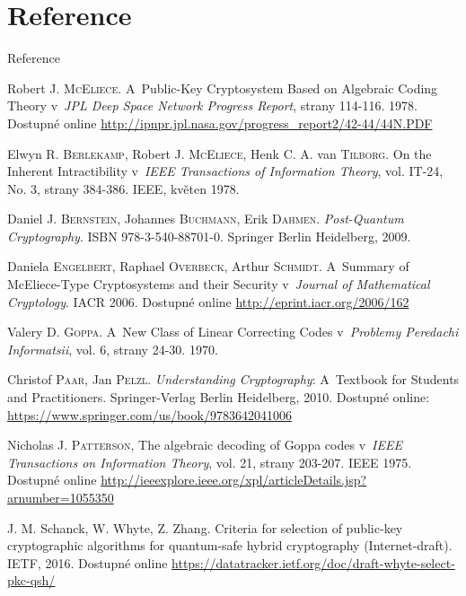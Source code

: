 \documentclass{beamer}
\begin{document}
\section{Reference}
\begin{frame}[allowframebreaks]{Reference}
    \begin{thebibliography}{99}

        Robert J. \textsc{McEliece}. A~Public-Key Cryptosystem Based on
        Algebraic Coding Theory v~\emph{JPL Deep Space Network Progress Report},
        strany 114-116. 1978. Dostupné online
        \url{http://ipnpr.jpl.nasa.gov/progress_report2/42-44/44N.PDF}

        Elwyn R. \textsc{Berlekamp}, Robert J. \textsc{McEliece}, Henk C. A. van
        \textsc{Tilborg}.  On the Inherent Intractibility v~\emph{IEEE
        Transactions of Information Theory}, vol. IT-24, No. 3, strany 384-386.
        IEEE, květen 1978.

        Daniel J. \textsc{Bernstein}, Johannes \textsc{Buchmann}, Erik
        \textsc{Dahmen}. \emph{Post-Quantum Cryptography}. ISBN
        978-3-540-88701-0.  Springer Berlin Heidelberg, 2009.

        Daniela \textsc{Engelbert}, Raphael \textsc{Overbeck}, Arthur
        \textsc{Schmidt}. A~Summary of McEliece-Type Cryptosystems and their
        Security v~\emph{Journal of Mathematical Cryptology}. IACR 2006.
        Dostupné online \url{http://eprint.iacr.org/2006/162}

        Valery D. \textsc{Goppa}. A~New Class of Linear Correcting Codes
        v~\emph{Problemy Peredachi Informatsii}, vol. 6, strany 24-30. 1970.

        Christof \textsc{Paar}, Jan \textsc{Pelzl}. \emph{Understanding
        Cryptography}: A~Textbook for Students and Practitioners.
        Springer-Verlag Berlin Heidelberg, 2010. Dostupné
        online: \url{https://www.springer.com/us/book/9783642041006}

        Nicholas J. \textsc{Patterson}, The algebraic decoding of Goppa codes
        v~\emph{IEEE Transactions on Information Theory}, vol. 21, strany
        203-207. IEEE 1975. Dostupné online
        \url{http://ieeexplore.ieee.org/xpl/articleDetails.jsp?arnumber=1055350}

        J. M. Schanck, W. Whyte, Z. Zhang. Criteria for selection of public-key
        cryptographic algorithms for quantum-safe hybrid cryptography
        (Internet-draft). IETF, 2016. Dostupné online
        \url{https://datatracker.ietf.org/doc/draft-whyte-select-pkc-qsh/}

    \end{thebibliography}

\end{frame}
\end{document}
